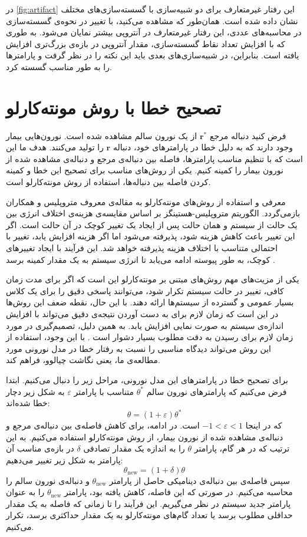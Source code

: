 در
\autoref{fig:artifact}
این رفتار غیرمتعارف برای دو شبیه‌سازی با گسسته‌سازی‌های مختلف نشان داده شده است.
همان‌طور که مشاهده می‌کنید، با تغییر در نحوه‌ی گسسته‌سازی در محاسبه‌های عددی، این رفتار غیرمتعارف در آنتروپی بیشتر نمایان می‌شود.
به طوری که با افزایش تعداد نقاط گسسته‌سازی، مقدار آنتروپی در بازه‌ی بزرگ‌تری افزایش یافته است.
بنابراین، در شبیه‌سازی‌های بعدی باید این نکته را در نظر گرفت و پارامتر‌ها را به طور مناسب گسسته کرد.

\section{تصحیح خطا با روش مونته‌کارلو}
فرض کنید دنباله مرجع
\( \mathbf{r}^{*} \)
از یک نورون سالم مشاهده شده است.
نورون‌هایی بیمار وجود دارند که به دلیل خطا در پارامترهای خود، دنباله
\( \mathbf{r} \)
را تولید می‌کنند.
هدف ما این است که با تنظیم مناسب پارامترها، فاصله بین دنباله‌ی مرجع و دنباله‌ی مشاهده شده از نورون بیمار را کمینه کنیم.
یکی از روش‌های مناسب برای تصحیح این خطا و کمینه کردن فاصله بین دنباله‌ها، استفاده از روش مونته‌کارلو است.

معرفی و استفاده از روش‌های مونته‌کارلو به مقاله‌ی معروف متروپلیس و همکاران
\cite{metropolis1953}
بازمی‌گردد.
الگوریتم متروپلیس-هستینگز
\cite{metropolis1953,hastings1970}
بر اساس مقایسه‌ی هزینه‌ی اختلاف انرژی بین یک حالت از سیستم و همان حالت پس از ایجاد یک تغییر کوچک در آن حالت است.
اگر این تغییر باعث کاهش هزینه شود، پذیرفته می‌شود اما اگر هزینه افزایش یابد، تغییر با احتمالی متناسب با اختلاف هزینه پذیرفته خواهد شد.
این فرآیند با ایجاد تغییرهای کوچک، به طور پیوسته ادامه می‌یابد تا انرژی سیستم به یک مقدار کمینه برسد
\cite{newman1999,landau2021}.

یکی از مزیت‌های مهم روش‌های مبتنی بر مونته‌کارلو این است که اگر برای مدت زمان کافی، تغییر در حالت سیستم تکرار شود، می‌توانند پاسخی دقیق را برای یک کلاس بسیار عمومی و گسترده از سیستم‌ها ارائه دهند.
با این حال، نقطه ضعف این روش‌ها در این است که زمان لازم برای به دست آوردن نتیجه‌ی دقیق می‌تواند با افزایش اندازه‌ی سیستم به صورت نمایی افزایش یابد.
به همین دلیل، تصمیم‌گیری در مورد زمان لازم برای رسیدن به دقت مطلوب بسیار دشوار است
\cite{zdeborova2016}.
با این وجود، استفاده از این روش می‌تواند دیدگاه مناسبی را نسبت به رفتار خطا در مدل نورونی مورد مطالعه‌ی ما، یعنی نگاشت چیالوو، فراهم کند.

برای تصحیح خطا در پارامترهای این مدل نورونی، مراحل زیر را دنبال می‌کنیم.
ابتدا فرض می‌کنیم که پارامترهای نورون سالم
\( \theta^{*} \)
متناسب با پارامتر
\( \varepsilon \)
به شکل زیر دچار خطا شده‌اند:
\[ \theta = (1 + \varepsilon) \theta^{*} \]
که در اینجا
\( -1 < \varepsilon < 1 \)
است.
در ادامه، برای کاهش فاصله‌ی بین دنباله‌ی مرجع و دنباله‌ی مشاهده شده از نورون بیمار، از روش مونته‌کارلو استفاده می‌کنیم.
به این ترتیب که در هر گام، پارامتر
\( \theta \)
را به اندازه یک مقدار تصادفی
\( \delta \)
در بازه‌ی مناسب آن پارامتر به شکل زیر تغییر می‌دهیم:
\[ \theta_{\text{new}} = (1 + \delta) \theta \]
سپس فاصله‌ی بین دنباله‌ی دینامیکی حاصل از پارامتر
\( \theta_{\text{new}} \)
و دنباله‌ی نورون سالم را محاسبه می‌کنیم.
در صورتی که این فاصله، کاهش یافته بود، پارامتر
\( \theta_{\text{new}} \)
را به عنوان پارامتر جدید سیستم در نظر می‌گیریم.
این فرآیند را تا زمانی که فاصله به یک مقدار حداقلی مطلوب برسد یا تعداد گام‌های مونته‌کارلو به یک مقدار حداکثری برسد، تکرار می‌کنیم.

